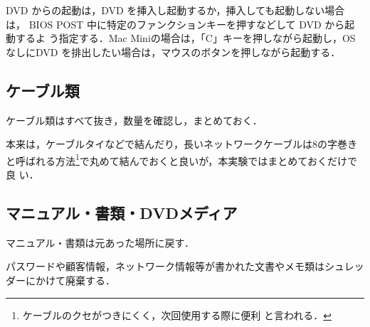 DVD からの起動は，DVD を挿入し起動するか，挿入しても起動しない場合は，
BIOS POST 中に特定のファンクションキーを押すなどして DVD から起動するよ
う指定する．Mac Miniの場合は，「C」キーを押しながら起動し，OS なしにDVD 
を排出したい場合は，マウスのボタンを押しながら起動する．

\subsection*{ケーブル類}

ケーブル類はすべて抜き，数量を確認し，まとめておく．

本来は，ケーブルタイなどで結んだり，長いネットワークケーブルは8の字巻き
と呼ばれる方法\footnote{ケーブルのクセがつきにくく，次回使用する際に便利
と言われる．}で丸めて結んでおくと良いが，本実験ではまとめておくだけで良
い．

\subsection*{マニュアル・書類・DVDメディア}

マニュアル・書類は元あった場所に戻す．

パスワードや顧客情報，ネットワーク情報等が書かれた文書やメモ類はシュレッ
ダーにかけて廃棄する．


